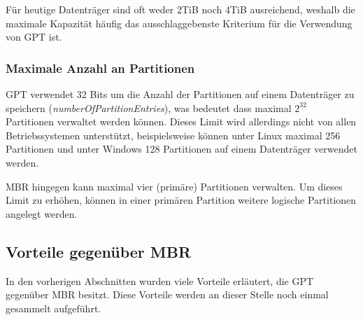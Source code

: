 Für heutige Datenträger sind oft weder 2TiB noch 4TiB ausreichend, weshalb die maximale Kapazität häufig das ausschlaggebenste Kriterium für die Verwendung von GPT ist.

\subsubsection{Maximale Anzahl an Partitionen}
\label{sec:gpt:limits:max-partition-count}

GPT verwendet 32 Bits um die Anzahl der Partitionen auf einem Datenträger zu speichern (\textit{numberOfPartitionEntries}), was bedeutet dass maximal $ 2^{32} $ Partitionen verwaltet werden können.
Dieses Limit wird allerdings nicht von allen Betriebssystemen unterstützt, beispielsweise können unter Linux maximal 256 Partitionen und unter Windows 128 Partitionen auf einem Datenträger verwendet werden.

MBR hingegen kann maximal vier (primäre) Partitionen verwalten.
Um dieses Limit zu erhöhen, können in einer primären Partition weitere logische Partitionen angelegt werden.

\subsection{Vorteile gegenüber MBR}
\label{sec:gpt:advantages}

In den vorherigen Abschnitten wurden viele Vorteile erläutert, die GPT gegenüber MBR besitzt.
Diese Vorteile werden an dieser Stelle noch einmal gesammelt aufgeführt.

